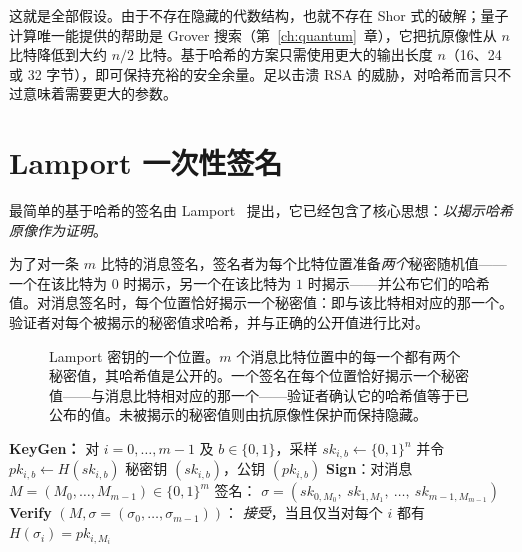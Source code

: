 这就是全部假设。由于不存在隐藏的代数结构，也就不存在 Shor 式的破解；量子计算唯一能提供的帮助是 Grover 搜索（第~\ref{ch:quantum}~章），它把抗原像性从 $n$ 比特降低到大约 $n/2$ 比特。基于哈希的方案只需使用更大的输出长度 $n$（16、24 或 32 字节），即可保持充裕的安全余量。足以击溃 RSA 的威胁，对哈希而言只不过意味着需要更大的参数。

\section{Lamport 一次性签名}
最简单的基于哈希的签名由 Lamport~\cite{lamport1979} 提出，它已经包含了核心思想：\emph{以揭示哈希原像作为证明}。

为了对一条 $m$ 比特的消息签名，签名者为每个比特位置准备\emph{两个}秘密随机值——一个在该比特为 $0$ 时揭示，另一个在该比特为 $1$ 时揭示——并公布它们的哈希值。对消息签名时，每个位置恰好揭示一个秘密值：即与该比特相对应的那一个。验证者对每个被揭示的秘密值求哈希，并与正确的公开值进行比对。

\begin{figure}[H]
\centering
{}
\caption{Lamport 密钥的一个位置。$m$ 个消息比特位置中的每一个都有两个秘密值，其哈希值是公开的。一个签名在每个位置恰好揭示一个秘密值——与消息比特相对应的那一个——验证者确认它的哈希值等于已公布的值。未被揭示的秘密值则由抗原像性保护而保持隐藏。}
\label{fig:lamport}
\end{figure}

\begin{algorithm}[H]
\caption{Lamport 一次性签名}
\label{alg:lamport}
\begin{algorithmic}[1]
\Statex \textbf{KeyGen：}
\State 对 $i=0,\dots,m-1$ 及 $b\in\{0,1\}$，采样 $sk_{i,b}\gets\{0,1\}^n$ 并令 $pk_{i,b}\gets H(sk_{i,b})$
\State \Return 秘密钥 $(sk_{i,b})$，公钥 $(pk_{i,b})$
\Statex \textbf{Sign}：对消息 $M=(M_0,\dots,M_{m-1})\in\{0,1\}^m$ 签名：
\State \Return $\sigma=(sk_{0,M_0},\ sk_{1,M_1},\ \dots,\ sk_{m-1,M_{m-1}})$
\Statex \textbf{Verify} $(M,\sigma=(\sigma_0,\dots,\sigma_{m-1}))$：
\State \Return \emph{接受}，当且仅当对每个 $i$ 都有 $H(\sigma_i)=pk_{i,M_i}$
\end{algorithmic}
\end{algorithm}

